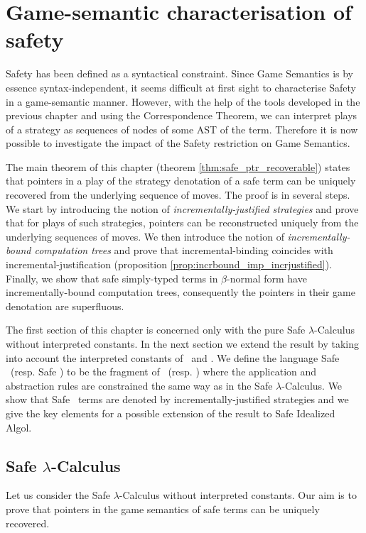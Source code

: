 \chapter{Game-semantic characterisation of safety}

Safety has been defined as a syntactical constraint. Since Game
Semantics is by essence syntax-independent, it seems difficult at
first sight to characterise Safety in a game-semantic manner.
However, with the help of the tools developed in the previous
chapter and using the Correspondence Theorem, we can interpret plays
of a strategy as sequences of nodes of some AST of the term.
Therefore it is now possible to investigate the impact of the Safety
restriction on Game Semantics.


The main theorem of this chapter (theorem
\ref{thm:safe_ptr_recoverable}) states that pointers in a play of
the strategy denotation of a safe term can be uniquely recovered
from the underlying sequence of moves. The proof is in several
steps. We start by introducing the notion of
\emph{incrementally-justified strategies} and prove that for plays
of such strategies, pointers can be reconstructed uniquely from the
underlying sequences of moves. We then introduce the notion of
\emph{incrementally-bound computation trees} and prove that
incremental-binding coincides with incremental-justification
(proposition \ref{prop:incrbound_imp_incrjustified}). Finally, we
show that safe simply-typed terms in $\beta$-normal form have
incrementally-bound computation trees, consequently the pointers in
their game denotation are superfluous.


The first section of this chapter is concerned only with the pure
Safe $\lambda$-Calculus without interpreted constants. In the next
section we extend the result by taking into account the interpreted
constants of \pcf\ and \ialgol. We define the language Safe \ialgol\
(resp. Safe \pcf) to be the fragment of \ialgol\ (resp. \pcf) where
the application and abstraction rules are constrained the same way
as in the Safe $\lambda$-Calculus. We show that Safe \pcf\ terms are
denoted by incrementally-justified strategies and we give the key
elements for a possible extension of the result to Safe Idealized
Algol.

\section{Safe $\lambda$-Calculus}
Let us consider the Safe $\lambda$-Calculus without interpreted
constants. Our aim is to prove that pointers in the game semantics
of safe terms can be uniquely recovered.

